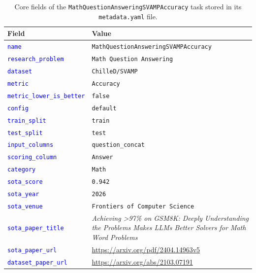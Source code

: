 \documentclass{fairmeta}
\begin{document}
\begin{table}
\small
\centering
\begin{NiceTabular}{lX}
\toprule
\textbf{Field} & \textbf{Value} \\
\midrule
\textcolor{blue}{\texttt{name}}              & \texttt{MathQuestionAnsweringSVAMPAccuracy} \\
\textcolor{blue}{\texttt{research\_problem}} & \texttt{Math Question Answering} \\
\textcolor{blue}{\texttt{dataset}}           & \texttt{ChilleD/SVAMP} \\
\textcolor{blue}{\texttt{metric}}            & \texttt{Accuracy} \\
\textcolor{blue}{\texttt{metric\_lower\_is\_better}} & \texttt{false} \\
\textcolor{blue}{\texttt{config}}            & \texttt{default} \\
\textcolor{blue}{\texttt{train\_split}}      & \texttt{train} \\
\textcolor{blue}{\texttt{test\_split}}       & \texttt{test} \\
\textcolor{blue}{\texttt{input\_columns}}    & \texttt{question\_concat} \\
\textcolor{blue}{\texttt{scoring\_column}}   & \texttt{Answer} \\
\textcolor{blue}{\texttt{category}}          & \texttt{Math} \\
\textcolor{blue}{\texttt{sota\_score}}       & \texttt{0.942} \\
\textcolor{blue}{\texttt{sota\_year}}        & \texttt{2026} \\
\textcolor{blue}{\texttt{sota\_venue}}       & \texttt{Frontiers of Computer Science} \\
\textcolor{blue}{\texttt{sota\_paper\_title}} & \textit{Achieving >97\% on GSM8K: Deeply Understanding the Problems Makes LLMs Better Solvers for Math Word Problems} \\
\textcolor{blue}{\texttt{sota\_paper\_url}}  & \url{https://arxiv.org/pdf/2404.14963v5} \\
\textcolor{blue}{\texttt{dataset\_paper\_url}} & \url{https://arxiv.org/abs/2103.07191} \\
\bottomrule
\end{NiceTabular}
\caption{Core fields of the \texttt{MathQuestionAnsweringSVAMPAccuracy} task stored in its \texttt{metadata.yaml} file.}
\label{tab:task_description}
\end{table}
\end{document}
